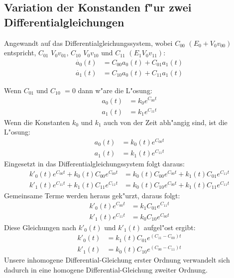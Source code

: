 \begin{refsection}
\subsection{Variation der Konstanden f"ur zwei Differentialgleichungen}
Angewandt auf das Differentialgleichungssystem,
wobei $C_{00}$ $(E_{0} + V_{0} v_{00})$
entspricht,
$C_{01}$ $V_{0} v_{01}$,
$C_{10}$ $V_{0} v_{10}$ und $C_{11}$ $(E_{1} V_{0} v_{11})$:
\begin{align*}
\dot{a_{0}}(t) &= C_{00}a_{0}(t) + C_{01}a_{1}(t)
\\
\dot{a_{1}}(t) &= C_{10}a_{0}(t) + C_{11}a_{1}(t)
\end{align*}

Wenn $ C_{01}$ und $ C_{10}$ $ =0$ dann w"are die L"osung:
\begin{align*}
a_{0}(t)&= k_0 e^{C_{00} t} 
\\
a_{1}(t)&= k_1 e^{C_{11} t}
\end{align*}
Wenn die Konstanten $ k_0 $ und $ k_1 $
auch von der Zeit abh"angig sind, ist die L"osung: 
\begin{align*}
a_{0}(t)&= k_0(t) e^{C_{00} t} 
\\
a_{1}(t)&= k_1(t) e^{C_{11} t} 
\end{align*}
Eingesetzt in das Differentialgleichungssystem folgt daraus:
\begin{align*}
k'_{0}(t) e^{C_{00} t} + k_{0}(t) C_{00} e^{C_{00} t}&= k_{0}(t) C_{00} e^{C_{00} t} + k_{1}(t)C_{01}e^{C_{11} t}
\\
k'_{1}(t) e^{C_{11} t} + k_{1}(t) C_{11} e^{C_{11} t}&= k_{0}(t) C_{10} e^{C_{00} t} + k_{1}(t)C_{11}e^{C_{11} t}
\end{align*}
Gemeinsame Terme werden heraus gek"urzt, daraus folgt:
\begin{align*}
k'_{0}(t) e^{C_{00} t}&= k_{1} C_{01} e^{C_{11} t}
\\
k'_{1}(t) e^{C_{11} t}&= k_{0} C_{10} e^{C_{00} t}
\end{align*}
Diese Gleichungen nach $ k'_{0}(t)$ und $ k'_{1}(t)$ aufgel"ost ergibt:
\begin{align*}
k'_{0}(t)&= k_{1}(t) C_{01} e^{(C_{11}-C_{00}) t}
\\
k'_{1}(t)&= k_{0}(t) C_{10} e^{(C_{00}-C_{11}) t}
\end{align*}
Unsere inhomogene Differential-Gleichung erster Ordnung verwandelt
sich dadurch in eine homogene Differential-Gleichung zweiter Ordnung.
\begin{align*}

\end{align*}
\end{refsection}
